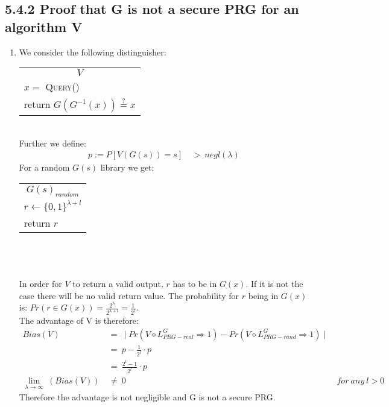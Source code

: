 \documentclass{report}
\begin{document}
	\subsection*{5.4.2 Proof that G is not a secure PRG for an algorithm V}
		\begin{enumerate}[]
			\item We consider the following distinguisher: \hspace*{2cm}
			\begin{tabular}{|l|}
				\hline \multicolumn{1}{|c|}{\cellcolor[gray]{0.8} $V$} \\
				$x =$ \textsc{Query()} \\
				return $G(G^{-1}(x)) \stackrel{?}{=} x$ \\ \hline
			\end{tabular} \\
			Further we define:
			\begin{align*}
				p := P[V(G(s))=s] \ & > \ negl(\lambda)
			\end{align*}
			For a random $G(s)$ library we get:
			\begin{tabular}{|l|}
				\hline \multicolumn{1}{|c|}{\cellcolor[gray]{0.8} $G(s)_{random}$} \\
				$r \leftarrow \{ 0,1 \} ^{\lambda + l}$ \\
				return $r$ \\ \hline
			\end{tabular} \\ \\ \\
			In order for $V$ to return a valid output, $r$ has to be in $G(x)$. If it is not the case there will be no valid return value. The probability for $r$ being in $G(x)$ is: $Pr(r \in G(x)) = \frac{2^{\lambda}}{2^{\lambda + l}} = \frac{1}{2^{l}}$. \\
			The advantage of V is therefore:
			\begin{align*}
				Bias(V) \ & = \ \mid Pr(V \diamond L^G_{PRG-real} \Rightarrow 1) - Pr(V \diamond L^G_{PRG-rand} \Rightarrow 1) \mid \ \\
				& = \ p - \frac{1}{2^{l}} \cdot p \\
				& = \ \frac{2^{l}-1}{2^{l}} \cdot p \\
				\lim_{\lambda \rightarrow \infty} \ (Bias(V)) \ & \neq \ 0 & for \ any \ l > 0
			\end{align*}
			Therefore the advantage is not negligible and G is not a secure PRG.
		\end{enumerate}
	
\end{document}

